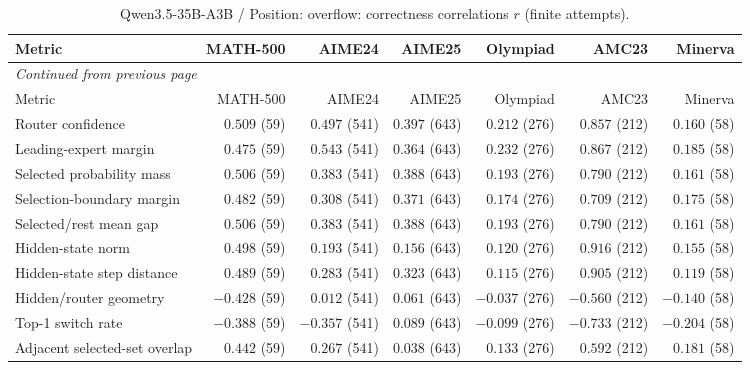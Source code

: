 \begingroup\scriptsize\setlength{\tabcolsep}{4pt}
\begin{longtable}{@{}lrrrrrr@{}}
\caption{Qwen3.5-35B-A3B / Position: overflow: correctness correlations $r$ (finite attempts).}\label{tab:multi-qwen-position-overflow}\\
\toprule
Metric & MATH-500 & AIME24 & AIME25 & Olympiad & AMC23 & Minerva \\
\midrule\endfirsthead
\multicolumn{7}{l}{\textit{Continued from previous page}}\\
\toprule
Metric & MATH-500 & AIME24 & AIME25 & Olympiad & AMC23 & Minerva \\
\midrule\endhead
\bottomrule\endfoot
Router confidence & $0.509$ (59) & $0.497$ (541) & $0.397$ (643) & $0.212$ (276) & $0.857$ (212) & $0.160$ (58) \\
Leading-expert margin & $0.475$ (59) & $0.543$ (541) & $0.364$ (643) & $0.232$ (276) & $0.867$ (212) & $0.185$ (58) \\
Selected probability mass & $0.506$ (59) & $0.383$ (541) & $0.388$ (643) & $0.193$ (276) & $0.790$ (212) & $0.161$ (58) \\
Selection-boundary margin & $0.482$ (59) & $0.308$ (541) & $0.371$ (643) & $0.174$ (276) & $0.709$ (212) & $0.175$ (58) \\
Selected/rest mean gap & $0.506$ (59) & $0.383$ (541) & $0.388$ (643) & $0.193$ (276) & $0.790$ (212) & $0.161$ (58) \\
Hidden-state norm & $0.498$ (59) & $0.193$ (541) & $0.156$ (643) & $0.120$ (276) & $0.916$ (212) & $0.155$ (58) \\
Hidden-state step distance & $0.489$ (59) & $0.283$ (541) & $0.323$ (643) & $0.115$ (276) & $0.905$ (212) & $0.119$ (58) \\
Hidden/router geometry & $-0.428$ (59) & $0.012$ (541) & $0.061$ (643) & $-0.037$ (276) & $-0.560$ (212) & $-0.140$ (58) \\
Top-1 switch rate & $-0.388$ (59) & $-0.357$ (541) & $0.089$ (643) & $-0.099$ (276) & $-0.733$ (212) & $-0.204$ (58) \\
Adjacent selected-set overlap & $0.442$ (59) & $0.267$ (541) & $0.038$ (643) & $0.133$ (276) & $0.592$ (212) & $0.181$ (58) \\
\end{longtable}\endgroup


